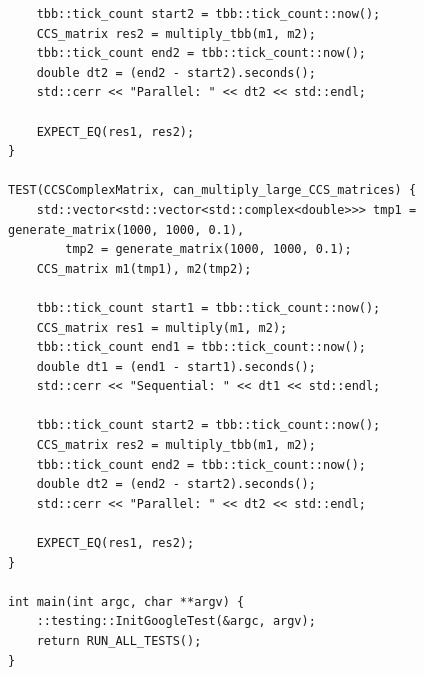 \documentclass{report}
\begin{document}
\begin{lstlisting}
    tbb::tick_count start2 = tbb::tick_count::now();
    CCS_matrix res2 = multiply_tbb(m1, m2);
    tbb::tick_count end2 = tbb::tick_count::now();
    double dt2 = (end2 - start2).seconds();
    std::cerr << "Parallel: " << dt2 << std::endl;

    EXPECT_EQ(res1, res2);
}

TEST(CCSComplexMatrix, can_multiply_large_CCS_matrices) {
    std::vector<std::vector<std::complex<double>>> tmp1 = generate_matrix(1000, 1000, 0.1),
        tmp2 = generate_matrix(1000, 1000, 0.1);
    CCS_matrix m1(tmp1), m2(tmp2);

    tbb::tick_count start1 = tbb::tick_count::now();
    CCS_matrix res1 = multiply(m1, m2);
    tbb::tick_count end1 = tbb::tick_count::now();
    double dt1 = (end1 - start1).seconds();
    std::cerr << "Sequential: " << dt1 << std::endl;

    tbb::tick_count start2 = tbb::tick_count::now();
    CCS_matrix res2 = multiply_tbb(m1, m2);
    tbb::tick_count end2 = tbb::tick_count::now();
    double dt2 = (end2 - start2).seconds();
    std::cerr << "Parallel: " << dt2 << std::endl;

    EXPECT_EQ(res1, res2);
}

int main(int argc, char **argv) {
    ::testing::InitGoogleTest(&argc, argv);
    return RUN_ALL_TESTS();
}
\end{lstlisting}
\end{document}
